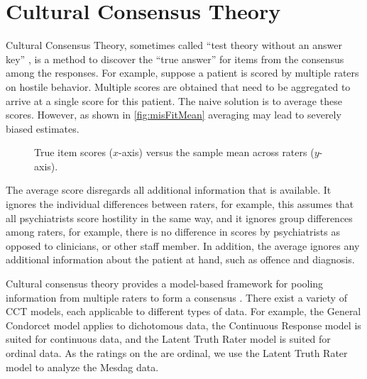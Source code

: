 \documentclass[a4paper,11pt]{article}
\begin{document}
\section{Cultural Consensus Theory}

Cultural Consensus Theory, sometimes called ``test theory without an answer key'' \parencite{batchelder1988test}, is a method to discover the ``true answer'' for items from the consensus among the responses.
For example, suppose a patient is scored by multiple raters on hostile behavior.
Multiple scores are obtained that need to be aggregated to arrive at a single score for this patient.
The naive solution is to average these scores.
However, as shown in \autoref{fig:misFitMean} averaging may lead to severely biased estimates.
\begin{figure}[!ht]
	\centering
	
	\caption{True item scores ($x$-axis) versus the sample mean across raters ($y$-axis).}
	\label{fig:misFitMean}
\end{figure}
The average score disregards all additional information that is available.
It ignores the individual differences between raters, for example, this assumes that all psychiatrists score hostility in the same way, and it ignores group differences among raters, for example, there is no difference in scores by psychiatrists as opposed to clinicians, or other staff member.
In addition, the average ignores any additional information about the patient at hand, such as offence and diagnosis.

Cultural consensus theory provides a model-based framework for pooling information from multiple raters to form a consensus \parencite{anders2014cultural}.
There exist a variety of CCT models, each applicable to different types of data.
For example, the General Condorcet model \parencite{Batchelder1986statistical} applies to dichotomous data, the Continuous Response model \parencite{anders2014cultural} is suited for continuous data, and the Latent Truth Rater model \parencite{Anders2015cultural} is suited for ordinal data.
As the ratings on the are ordinal, we use the Latent Truth Rater model to analyze the Mesdag data.
\end{document}
